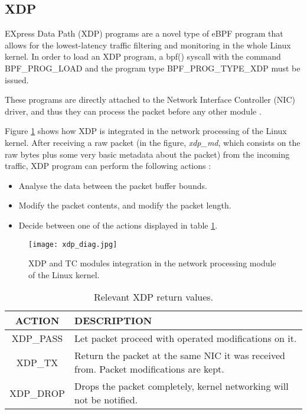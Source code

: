 \subsection{XDP} \label{subsection:xdp}
EXpress Data Path (XDP) programs are a novel type of eBPF program that allows for the lowest-latency traffic filtering and monitoring in the whole Linux kernel. In order to load an XDP program, a bpf() syscall with the command BPF\_PROG\_LOAD and the program type BPF\_PROG\_TYPE\_XDP must be issued. 

These programs are directly attached to the Network Interface Controller (NIC) driver, and thus they can process the packet before any other module \cite{xdp_gentle_intro}.

Figure \ref{fig:xdp_diag} shows how XDP is integrated in the network processing of the Linux kernel. After receiving a raw packet (in the figure, \textit{xdp\_md}, which consists on the raw bytes plus some very basic metadata about the packet) from the incoming traffic, XDP program can perform the following actions \cite{xdp_manual}:
\begin{itemize}
\item Analyse the data between the packet buffer bounds.
\item Modify the packet contents, and modify the packet length.
\item Decide between one of the actions displayed in table \ref{table:xdp_actions_av}.
\end{itemize}

\begin{figure}[htbp]
	\centering
	\texttt{[image: xdp\_diag.jpg]}
	\caption{XDP and TC modules integration in the network processing module of the Linux kernel.}
	\label{fig:xdp_diag}
\end{figure}

\begin{table}[htbp]
\begin{tabular}{|c|>{\centering\arraybackslash}p{10cm}|}
\hline
ACTION & DESCRIPTION\\
\hline
\hline
XDP\_PASS & Let packet proceed with operated modifications on it.\\
\hline
XDP\_TX & Return the packet at the same NIC it was received from. Packet modifications are kept.\\
\hline
XDP\_DROP & Drops the packet completely, kernel networking will not be notified.\\
\hline
\end{tabular}
\caption{Relevant XDP return values.}
\label{table:xdp_actions_av}
\end{table}

